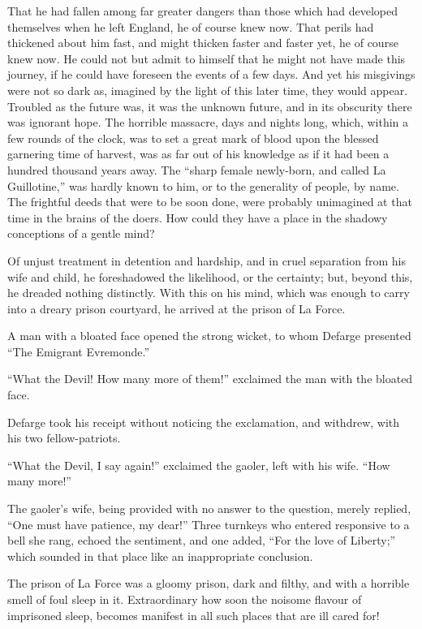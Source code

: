 That he had fallen among far greater dangers than those which had
developed themselves when he left England, he of course knew now.
That perils had thickened about him fast, and might thicken faster
and faster yet, he of course knew now.  He could not but admit to
himself that he might not have made this journey, if he could have
foreseen the events of a few days.  And yet his misgivings were not
so dark as, imagined by the light of this later time, they would appear.
Troubled as the future was, it was the unknown future, and in its
obscurity there was ignorant hope.  The horrible massacre, days and
nights long, which, within a few rounds of the clock, was to set a
great mark of blood upon the blessed garnering time of harvest, was
as far out of his knowledge as if it had been a hundred thousand
years away.  The ``sharp female newly-born, and called La Guillotine,''
was hardly known to him, or to the generality of people, by name.
The frightful deeds that were to be soon done, were probably
unimagined at that time in the brains of the doers.  How could they
have a place in the shadowy conceptions of a gentle mind?

Of unjust treatment in detention and hardship, and in cruel
separation from his wife and child, he foreshadowed the likelihood,
or the certainty; but, beyond this, he dreaded nothing distinctly.
With this on his mind, which was enough to carry into a dreary prison
courtyard, he arrived at the prison of La Force.

A man with a bloated face opened the strong wicket, to whom Defarge
presented ``The Emigrant Evremonde.''

``What the Devil!  How many more of them!'' exclaimed the man with
the bloated face.

Defarge took his receipt without noticing the exclamation,
and withdrew, with his two fellow-patriots.

``What the Devil, I say again!'' exclaimed the gaoler, left with his wife.
``How many more!''

The gaoler's wife, being provided with no answer to the question,
merely replied, ``One must have patience, my dear!''  Three turnkeys who
entered responsive to a bell she rang, echoed the sentiment, and one
added, ``For the love of Liberty;'' which sounded in that place like an
inappropriate conclusion.

The prison of La Force was a gloomy prison, dark and filthy, and with
a horrible smell of foul sleep in it.  Extraordinary how soon the
noisome flavour of imprisoned sleep, becomes manifest in all such
places that are ill cared for!

